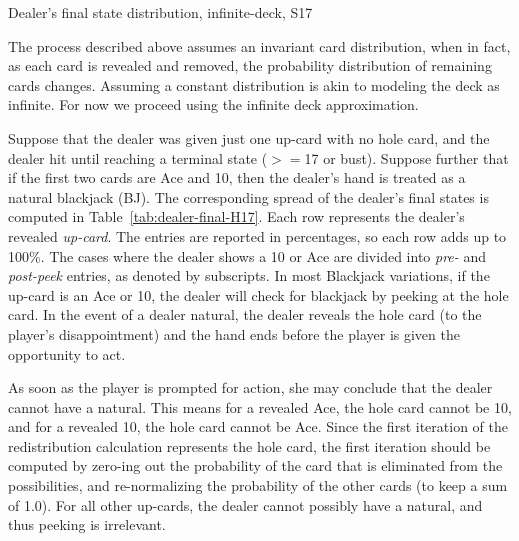 \begin{table}[ht!]
\caption{Dealer's final state distribution, infinite-deck, S17}
\begin{center}

\end{center}
\label{tab:dealer-final-S17}
\end{table}

The process described above assumes an invariant
card distribution, when in fact, as each card is revealed and removed, 
the probability distribution of remaining cards changes.
Assuming a constant distribution is akin to modeling
the deck as infinite.
For now we proceed using the infinite deck approximation.  

Suppose that the dealer was given just one up-card with no hole card, 
and the dealer hit until reaching a terminal state ($>=$17 or bust).
Suppose further that if the first two cards are Ace and 10,
then the dealer's hand is treated as a natural blackjack (BJ).
The corresponding spread of the dealer's final states is computed in
Table~\ref{tab:dealer-final-H17}.
Each row represents the dealer's revealed \emph{up-card}.
The entries are reported in percentages, so each row adds up to 100\%.
The cases where the dealer shows a 10 or Ace are divided into 
\emph{pre-} and \emph{post-peek} entries, as denoted by subscripts.  
In most Blackjack variations, if the up-card is an Ace or 10, 
the dealer will check for blackjack by peeking at the hole card.
In the event of a dealer natural, 
the dealer reveals the hole card (to the player's disappointment)
and the hand ends before the player is given the opportunity to act.

As soon as the player is prompted for action, she may conclude that the 
dealer cannot have a natural.
This means for a revealed Ace, the hole card cannot be 10, 
and for a revealed 10, the hole card cannot be Ace.
Since the first iteration of the redistribution 
calculation represents the hole card, the first iteration
should be computed by zero-ing out the probability of the
card that is eliminated from the possibilities, and re-normalizing
the probability of the other cards (to keep a sum of 1.0).  
For all other up-cards, the dealer cannot possibly have a natural,
and thus peeking is irrelevant.

\begin{comment}
\begin{table}[ht!]
\caption{Dealer's final state distribution, S17, pre-peek}
\begin{center}

\end{center}
\label{tab:dealer-final-S17-pre-peek}
\end{table}

\begin{table}[ht!]
\caption{Dealer's final state distribution, S17, post-peek}
\begin{center}

\end{center}
\label{tab:dealer-final-S17-post-peek}
\end{table}
\end{comment}

